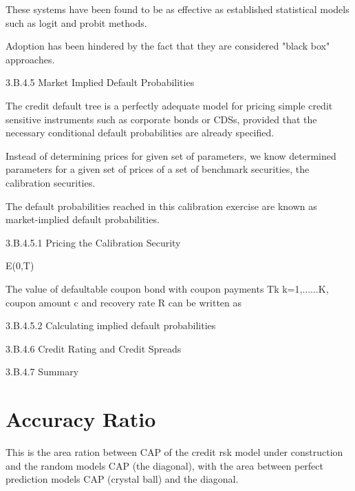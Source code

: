 These systems have been found to be as effective as established statistical models such as logit and probit methods.

Adoption has been hindered by the fact that they are considered "black box" approaches.


 

3.B.4.5 Market Implied Default Probabilities

The credit default tree is a perfectly adequate model for pricing simple credit sensitive instruments such as corporate bonds or CDSs, provided that the necessary conditional default probabilities are already specified.

Instead of determining prices for given set of parameters, we know determined parameters for a given set of prices of a set of benchmark securities, the calibration securities.

The default probabilities reached in this calibration exercise are known as market-implied default probabilities.


3.B.4.5.1 Pricing the Calibration Security

 

 

E(0,T)

 

The value of defaultable coupon bond with coupon payments Tk  k=1,......K, coupon amount c and recovery rate R can be written as

 


 











 

 

3.B.4.5.2 Calculating implied default probabilities

 

3.B.4.6 Credit Rating and Credit Spreads

3.B.4.7 Summary 

 



\section{Accuracy Ratio} %
This is the area ration between CAP of the credit rsk model under construction and the random models CAP (the diagonal), with the area
between perfect prediction models CAP (crystal ball) and the diagonal.

